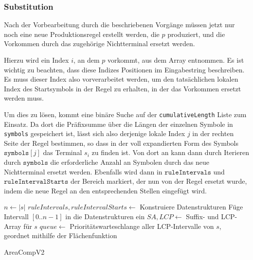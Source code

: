 \subsubsection{Substitution}

Nach der Vorbearbeitung durch die beschriebenen Vorgänge müssen jetzt nur noch eine neue Produktionsregel erstellt werden, die $p$ produziert, und die Vorkommen durch das zugehörige Nichtterminal ersetzt werden.

Hierzu wird ein Index $i$, an dem $p$ vorkommt, aus dem Array entnommen. Es ist wichtig zu beachten, dass diese Indizes Positionen im Eingabestring beschreiben. Es muss dieser Index also vorverarbeitet werden, um den tatsächlichen lokalen Index des Startsymbols in der Regel zu erhalten, in der das Vorkommen ersetzt werden muss.

Um dies zu lösen, kommt eine binäre Suche auf der \texttt{cumulativeLength} Liste zum Einsatz. Da dort die Präfixsumme über die Längen der einzelnen Symbole in \texttt{symbols} gespeichert ist, 
lässt sich also derjenige lokale Index $j$ in der rechten Seite der Regel bestimmen, so dass in der voll expandierten Form des Symbols $\texttt{symbols}[j]$ das Terminal $s_{i}$ zu finden ist.
Von dort an kann dann durch Iterieren durch $\texttt{symbols}$ die erforderliche Anzahl an Symbolen durch das neue Nichtterminal ersetzt werden.
Ebenfalls wird dann in $\texttt{ruleIntervals}$ und $\texttt{ruleIntervalStarts}$ der Bereich markiert, der nun von der Regel ersetzt wurde, indem die neue Regel an den entsprechenden Stellen eingefügt wird.

\begin{algorithm}[t]
    $n \leftarrow |s|$\;
    $ruleIntervals, ruleIntervalStarts \leftarrow$ Konstruiere Datenstrukturen\;
    Füge Intervall $[0..n-1]$ in die Datenstrukturen ein\;
    $SA, LCP \leftarrow$ Suffix- und LCP-Array für $s$\;
    $queue \leftarrow$ Prioritätswarteschlange aller LCP-Intervalle von $s$, geordnet mithilfe der Flächenfunktion\;

    \caption{AreaCompV2}
    \label{v2algo}
\end{algorithm}


